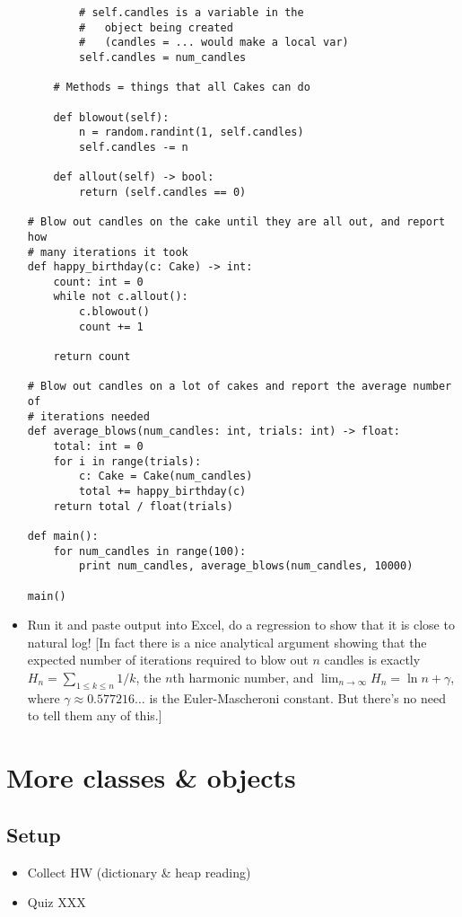\documentclass{article}
\newcommand{\notready}{\textcolor{red}{\XSolidBold}\xspace}
\begin{document}
\begin{itemize}
\begin{verbatim}
        # self.candles is a variable in the
        #   object being created
        #   (candles = ... would make a local var)
        self.candles = num_candles

    # Methods = things that all Cakes can do

    def blowout(self):
        n = random.randint(1, self.candles)
        self.candles -= n

    def allout(self) -> bool:
        return (self.candles == 0)

# Blow out candles on the cake until they are all out, and report how
# many iterations it took
def happy_birthday(c: Cake) -> int:
    count: int = 0
    while not c.allout():
        c.blowout()
        count += 1

    return count

# Blow out candles on a lot of cakes and report the average number of
# iterations needed
def average_blows(num_candles: int, trials: int) -> float:
    total: int = 0
    for i in range(trials):
        c: Cake = Cake(num_candles)
        total += happy_birthday(c)
    return total / float(trials)

def main():
    for num_candles in range(100):
        print num_candles, average_blows(num_candles, 10000)

main()
\end{verbatim}
\item Run it and paste output into Excel, do a regression to show that
  it is close to natural log! [In fact there is a nice analytical
  argument showing that the expected number of iterations required to
  blow out $n$ candles is exactly $H_n = \sum_{1 \leq k \leq n} 1/k$,
  the $n$th harmonic number, and
  $\lim_{n \to \infty} H_n = \ln n + \gamma$, where
  $\gamma \approx 0.577216\dots$ is the Euler-Mascheroni constant.
  But there's no need to tell them any of this.]
\end{itemize}

\newpage
\section{\notready More classes \& objects}

\subsection*{Setup}
\begin{itemize}
\item Collect HW (dictionary \& heap reading)
\item Quiz XXX
\end{itemize}
\end{document}
